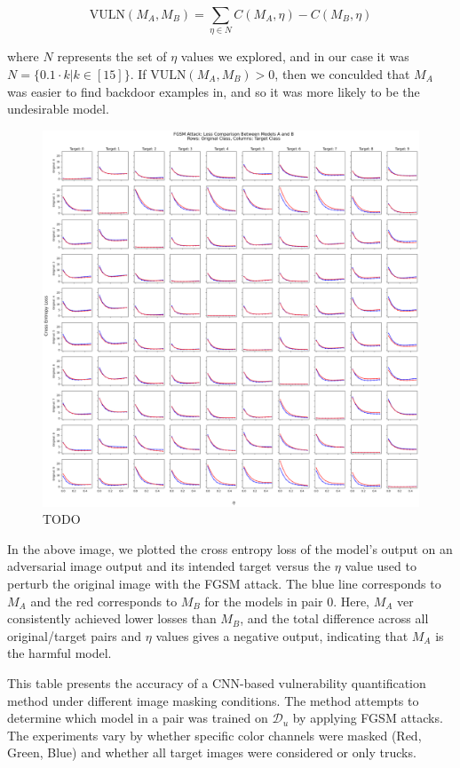 \documentclass[letterpaper]{article} %
\begin{document}
$$\text{VULN}(M_A, M_B) = \sum_{\eta \in N} C(M_A,\eta) - C(M_B,\eta)$$

where $N$ represents the set of $\eta$ values we explored, and in our case it was $N=\{0.1\cdot k | k \in [15]\}$. If $\text{VULN}(M_A,M_B) > 0$, then we conculded that $M_A$ was easier to find backdoor examples in, and so it was more likely to be the undesirable model.

\begin{figure}[h!]
\centering
\includegraphics[width=\columnwidth]{figures/round_1_FGSM_attacks.png}
\caption{TODO}
\end{figure}


In the above image, we plotted the cross entropy loss of the model's output on an adversarial image output and its intended target versus the $\eta$ value used to perturb the original image with the FGSM attack. The blue line corresponds to $M_A$ and the red corresponds to $M_B$ for the models in pair 0. Here, $M_A$ ver consistently achieved lower losses than $M_B$, and the total difference across all original/target pairs and $\eta$ values gives a negative output, indicating that $M_A$ is the harmful model.

This table presents the accuracy of a CNN-based vulnerability quantification method under different image masking conditions. The method attempts to determine which model in a pair was trained on $\mathcal{D}_u$ by applying FGSM attacks. The experiments vary by whether specific color channels were masked (Red, Green, Blue) and whether all target images were considered or only trucks.
\end{document}
